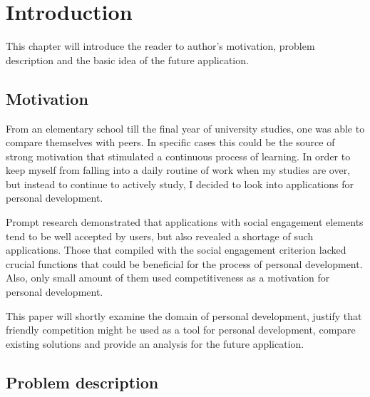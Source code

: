 

\chapter{Introduction}\label{ch:introduction}

This chapter will introduce the reader to author's motivation, problem description and the basic idea of the future application.


\section{Motivation}\label{sec:introduction-motivation}

From an elementary school till the final year of university studies, one was able to compare themselves with peers.
In specific cases this could be the source of strong motivation that stimulated a continuous process of learning.
In order to keep myself from falling into a daily routine of work when my studies are over,
but instead to continue to actively study, I decided to look into applications for personal development.

Prompt research demonstrated that applications with social engagement elements tend to be well accepted by users,
but also revealed a shortage of such applications.
Those that compiled with the social engagement criterion lacked crucial functions that could be beneficial for the process of personal development.
Also, only small amount of them used competitiveness as a motivation for personal development.

This paper will shortly examine the domain of personal development, justify that friendly competition might be used as a tool for personal development,
compare existing solutions and provide an analysis for the future application.


\section{Problem description}\label{sec:problem-description}

